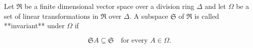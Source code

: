Let $\Re$ be a finite dimensional vector space over a division ring $\Delta$ and let $\Omega$ be a set of linear transformations in $\Re$ over $\Delta$. A subspace $\mathfrak{S}$ of $\Re$ is called **invariant** under $\Omega$ if

$$\mathfrak{S} A \subseteq \mathfrak{S} \quad \text{for every } A \in \Omega.$$

